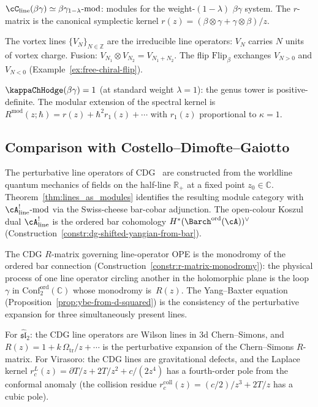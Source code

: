 \begin{computation}
\label{comp:line-op-betagamma}
$\cC_{\mathrm{line}}(\beta\gamma)
\simeq\beta\gamma_{1-\lambda}\text{-mod}$:
modules for the weight-$(1{-}\lambda)$ $\beta\gamma$ system.
The $r$-matrix is the canonical symplectic kernel
$r(z)=(\beta\otimes\gamma+\gamma\otimes\beta)/z$.

The vortex lines $\{V_N\}_{N\in\mathbb Z}$ are the
irreducible line operators: $V_N$ carries $N$ units of
vortex charge. Fusion: $V_{N_1}\otimes V_{N_2}=V_{N_1+N_2}$.
The flip $\mathrm{Flip}_\beta$ exchanges $V_{N>0}$ and
$V_{N<0}$ (Example~\ref{ex:free-chiral-flip}).

$\kappaChHodge(\beta\gamma)=1$ (at standard weight $\lambda=1$): the genus tower
is positive-definite. The modular extension of the spectral kernel is
$R^{\mathrm{mod}}(z;\hbar)=r(z)+\hbar^2 r_1(z)+\cdots$
with $r_1(z)$ proportional to $\kappa=1$.
\end{computation}

\subsection{Comparison with Costello--Dimofte--Gaiotto}
\label{subsec:cdg-comparison}

\begin{remark}[CDG line operators = ordered bar cohomology modules]
\label{rem:cdg-comparison}
The perturbative line operators of CDG~\cite{CDG20} are
constructed from the worldline quantum mechanics of fields
on the half-line $\mathbb R_+$ at a fixed point $z_0\in\mathbb C$.
Theorem~\ref{thm:lines_as_modules} identifies the resulting
module category with $\cA^!_{\mathrm{line}}\text{-mod}$ via the
Swiss-cheese bar-cobar adjunction. The open-colour Koszul dual
$\cA^!_{\mathrm{line}}$ is the
ordered bar cohomology
$H^*({\Barch}^{\mathrm{ord}}(\cA))^\vee$
(Construction~\ref{constr:dg-shifted-yangian-from-bar}).

The CDG $R$-matrix governing line-operator OPE is the
monodromy of the ordered bar connection
(Construction~\ref{constr:r-matrix-monodromy}):
the physical process of one line operator circling another
in the holomorphic plane is the loop $\gamma$ in
$\mathrm{Conf}_2^{\mathrm{ord}}(\mathbb C)$ whose monodromy
is~$R(z)$. The Yang--Baxter equation
(Proposition~\ref{prop:ybe-from-d-squared}) is the
consistency of the perturbative expansion for three
simultaneously present lines.

For $\widehat{\mathfrak{sl}}_2$: the CDG line operators are
Wilson lines in 3d Chern--Simons, and $R(z)=1+k\,\Omega_{\mathrm{tr}}/z+\cdots$
is the perturbative expansion of the Chern--Simons $R$-matrix.
For Virasoro: the CDG lines are gravitational defects, and
the Laplace kernel $r^L_c(z)=\partial T/z+2T/z^2+c/(2z^4)$ has a
fourth-order pole from the conformal anomaly (the collision residue
$r^{\mathrm{coll}}_c(z) = (c/2)/z^3 + 2T/z$ has a cubic pole).
\end{remark}

